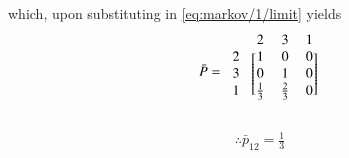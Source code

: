   which, upon substituting in \eqref{eq:markov/1/limit} yields
\begin{align}
\bar P=\begin{blockarray}{cccccc}
&2 & 3 & 1 \\
\begin{block}{c[ccccc]}
    2 & 1 & 0 & 0\\ 
    3 & 0 & 1 & 0\\ 
    1 & \frac{1}{3} & \frac{2}{3} & 0\\    
\end{block}
\end{blockarray}
\end{align}

\begin{align}
\therefore \bar p_{12}=\frac{1}{3}
\end{align}
